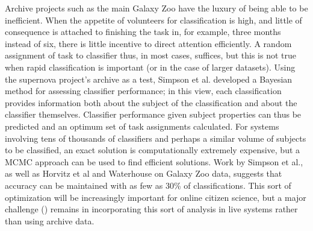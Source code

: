 \documentclass{ar2e}
\begin{document}
Archive projects such as the main Galaxy Zoo have the luxury of being able to be
inefficient.   When the appetite of
volunteers for classification is high, and little of consequence is attached to
finishing the task in, for example, three months instead of six, there is little
incentive to direct attention efficiently. A random assignment of task to
classifier thus, in most cases, suffices, but this is not true when rapid
classification is important (or in the case of larger datasets). Using the
supernova project's archive as a test, Simpson et al. developed a Bayesian
method for assessing classifier performance; in this view, each classification
provides information both about the subject of the classification and about the
classifier themselves. Classifier performance given subject properties can thus
be predicted and an optimum set of task assignments calculated. For systems
involving tens of thousands of classifiers and perhaps a similar volume of
subjects to be classified, an exact solution is computationally extremely
expensive, but a MCMC approach can be used to find efficient solutions. Work by
Simpson et al., as well as Horvitz et al and Waterhouse on Galaxy Zoo data,
suggests that accuracy can be maintained with as few as 30\% of classifications.
This sort of optimization will be increasingly important for online citizen
science, but a major challenge () remains in
incorporating this sort of analysis in live systems rather than using archive
data. 



\end{document}
